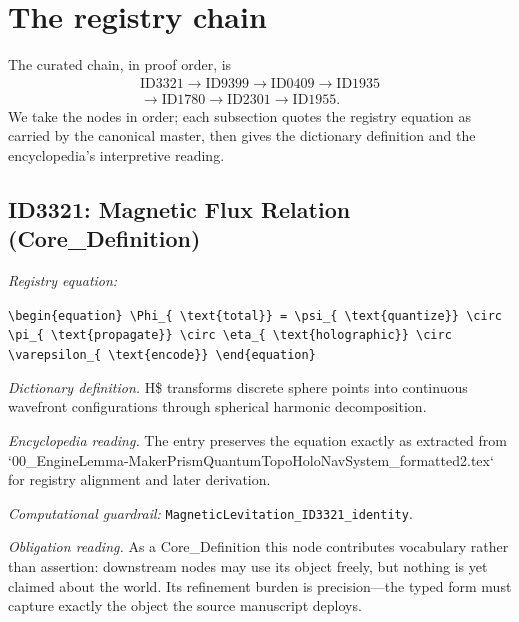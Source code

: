 \documentclass[11pt]{article}
\theoremstyle{remark}
\begin{document}
\section{The registry chain}
\label{sec:chain}

The curated chain, in proof order, is
\begin{equation*}
\begin{gathered}
\text{ID3321} \to \text{ID9399} \to \text{ID0409} \to \text{ID1935} \\
\to \text{ID1780} \to \text{ID2301} \to \text{ID1955}.
\end{gathered}
\end{equation*}
We take the nodes in order; each subsection quotes the registry equation as carried by the canonical master, then gives the dictionary definition and the encyclopedia's interpretive reading.

\subsection{ID3321: Magnetic Flux Relation (Core\_Definition)}

\noindent\textit{Registry equation:}\par
{\small\texttt{\textbackslash{}begin\{equation\} \textbackslash{}Phi\_\{ \textbackslash{}text\{total\}\} = \textbackslash{}psi\_\{ \textbackslash{}text\{quantize\}\} \textbackslash{}circ \textbackslash{}pi\_\{ \textbackslash{}text\{propagate\}\} \textbackslash{}circ \textbackslash{}eta\_\{ \textbackslash{}text\{holographic\}\} \textbackslash{}circ \textbackslash{}varepsilon\_\{ \textbackslash{}text\{encode\}\} \textbackslash{}end\{equation\}}}\par\medskip
\noindent\textit{Dictionary definition.} H\$ transforms discrete sphere points into continuous wavefront configurations through spherical harmonic decomposition.\par\medskip
\noindent\textit{Encyclopedia reading.} The entry preserves the equation exactly as extracted from `00\_EngineLemma-MakerPrismQuantumTopoHoloNavSystem\_formatted2.tex` for registry alignment and later derivation.
\par\medskip\noindent\textit{Computational guardrail:} \texttt{MagneticLevitation\_ID3321\_identity}.
\par\medskip\noindent\textit{Obligation reading.} As a Core\_Definition this node contributes vocabulary rather than assertion: downstream nodes may use its object freely, but nothing is yet claimed about the world. Its refinement burden is precision---the typed form must capture exactly the object the source manuscript deploys.
\end{document}
